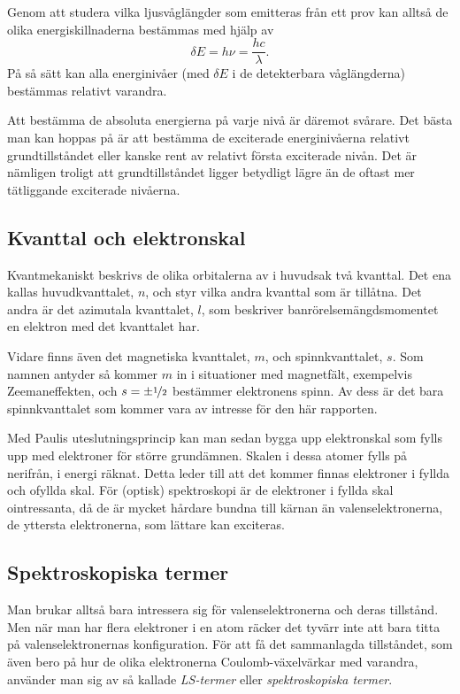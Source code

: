 \documentclass[11pt,a4paper]{article}
\begin{document}
 
Genom att studera vilka ljusvåglängder som emitteras från ett prov
kan alltså de olika energiskillnaderna bestämmas med hjälp av  
\[\delta E = h\nu=\frac{hc}{\lambda}.\]
På så sätt kan alla energinivåer (med $\delta E$ i de detekterbara
våglängderna) bestämmas relativt varandra. 

Att bestämma de absoluta
energierna på varje nivå är däremot svårare. Det bästa man kan hoppas
på är att bestämma de exciterade energinivåerna relativt
grundtillståndet eller kanske rent av relativt första exciterade
nivån. Det är nämligen troligt att grundtillståndet ligger betydligt
lägre än de oftast mer tätliggande exciterade nivåerna. 

\subsection{Kvanttal och elektronskal}
Kvantmekaniskt beskrivs de olika orbitalerna av i huvudsak två
kvanttal. Det ena kallas huvudkvanttalet, $n$, och styr vilka andra
kvanttal som är tillåtna. Det andra är det azimutala kvanttalet, $l$,
som beskriver banrörelsemängdsmomentet en elektron med det kvanttalet
har. 

Vidare finns även det magnetiska kvanttalet, $m$, och spinnkvanttalet,
$s$. Som namnen antyder så kommer $m$ in i situationer med magnetfält,
exempelvis Zeemaneffekten, och $s=\pm\nicefrac{1}{2}$ bestämmer
elektronens spinn. 
Av dess är det bara spinnkvanttalet som kommer vara av intresse för
den här rapporten.  

Med Paulis uteslutningsprincip kan man sedan bygga upp elektronskal
som fylls upp med elektroner för större grundämnen. Skalen i dessa
atomer fylls på nerifrån, i energi räknat. Detta leder till att det
kommer finnas elektroner i fyllda och ofyllda skal. För (optisk)
spektroskopi är de elektroner i fyllda skal ointressanta, då de är
mycket hårdare bundna till kärnan än valenselektronerna, de yttersta
elektronerna, som lättare kan exciteras. 



\subsection{Spektroskopiska termer}\label{sec:term}
Man brukar alltså bara intressera sig för valenselektronerna och deras
tillstånd. Men när man har flera elektroner i en atom räcker det
tyvärr inte att bara titta på valenselektronernas konfiguration. För att
få det sammanlagda tillståndet, som även bero på hur de olika
elektronerna Coulomb-växelvärkar med varandra, använder man sig av så
kallade \emph{LS-termer} eller \emph{spektroskopiska termer}.
\end{document}
